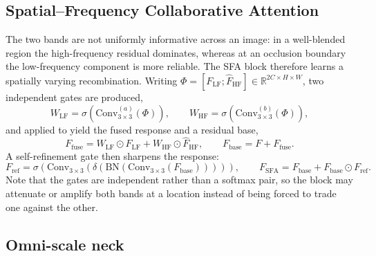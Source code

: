 \documentclass[3p,times,procedia]{elsarticle}
\newcommand{\eltmul}{\odot}
\begin{document}
\subsection{Spatial--Frequency Collaborative Attention}

The two bands are not uniformly informative across an image: in a well-blended region the high-frequency residual dominates, whereas at an occlusion boundary the low-frequency component is more reliable. The SFA block therefore learns a spatially varying recombination. Writing $\Phi = [F_{\mathrm{LF}} ; \hat{F}_{\mathrm{HF}}] \in \mathbb{R}^{2C \times H \times W}$, two independent gates are produced,
\begin{equation}
W_{\mathrm{LF}} = \sigma\!\left(\mathrm{Conv}_{3\times3}^{(a)}(\Phi)\right),
\qquad
W_{\mathrm{HF}} = \sigma\!\left(\mathrm{Conv}_{3\times3}^{(b)}(\Phi)\right),
\end{equation}
and applied to yield the fused response and a residual base,
\begin{equation}
F_{\mathrm{fuse}} = W_{\mathrm{LF}} \eltmul F_{\mathrm{LF}} + W_{\mathrm{HF}} \eltmul \hat{F}_{\mathrm{HF}},
\qquad
F_{\mathrm{base}} = F + F_{\mathrm{fuse}} .
\end{equation}
A self-refinement gate then sharpens the response:
\begin{equation}
F_{\mathrm{ref}} = \sigma\!\left(\mathrm{Conv}_{3\times3}\!\left(\delta\!\left(\mathrm{BN}
\left(\mathrm{Conv}_{3\times3}(F_{\mathrm{base}})\right)\right)\right)\right),
\qquad
F_{\mathrm{SFA}} = F_{\mathrm{base}} + F_{\mathrm{base}} \eltmul F_{\mathrm{ref}} .
\end{equation}
Note that the gates are independent rather than a softmax pair, so the block may attenuate or amplify both bands at a location instead of being forced to trade one against the other.

\subsection{Omni-scale neck}
\end{document}

